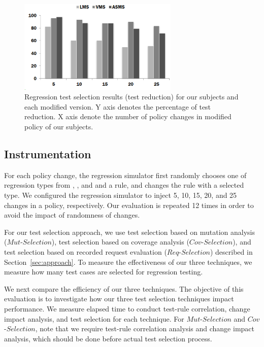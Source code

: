 \begin{figure}[htbp]
    \centering
        \includegraphics[width=3.0in]{reduction.eps}
        \vspace{-5pt}
    \caption{\label{fig:reduction} Regression test selection results (test reduction) for our subjects and each modified version. Y axis
    denotes the percentage of test reduction. X axis denote the number of policy changes in modified policy of our subjects.}
    \vspace{-10pt}
\end{figure}

\subsection{Instrumentation}
For each policy change, the regression simulator first randomly chooses one of regression types from , ,
and  and a rule, and changes the rule with a selected type.
We configured the regression simulator to inject 5, 10, 15, 20, and 25 changes in a policy, respectively.
Our evaluation is repeated 12 times in order to avoid the impact of randomness of changes.

For our test selection approach, we use test selection based on mutation analysis ($Mut$-$Selection$),
test selection based on coverage analysis ($Cov$-$Selection$), and
test selection based on recorded request evaluation ($Req$-$Selection$)
described in Section~\ref{sec:approach}.
To measure the effectiveness of our three techniques,
we measure how many test cases are selected for regression testing.

We next compare the efficiency of our three techniques.
The objective of this evaluation is to investigate how our three test selection techniques impact performance. We measure elapsed time to conduct test-rule correlation,
change impact analysis, and test selection for each technique.
For $Mut$-$Selection$ and $Cov$-$Selection$, note that we require test-rule correlation analysis
and change impact analysis, which should be done before actual test selection process.

